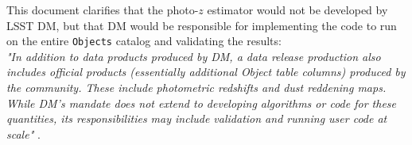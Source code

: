\documentclass[DM,lsstdraft,toc]{lsstdoc}
\begin{document}
This document clarifies that the photo-$z$ estimator would not be developed by LSST DM, but that DM would be responsible for implementing the code to run on the entire {\tt Objects} catalog and validating the results: \\
{\it "In addition to data products produced by DM, a data release production also includes official
products (essentially additional Object table columns) produced by the community. These
include photometric redshifts and dust reddening maps. While DM's mandate does not extend
to developing algorithms or code for these quantities, its responsibilities may include validation
and running user code at scale"} .
\end{document}
